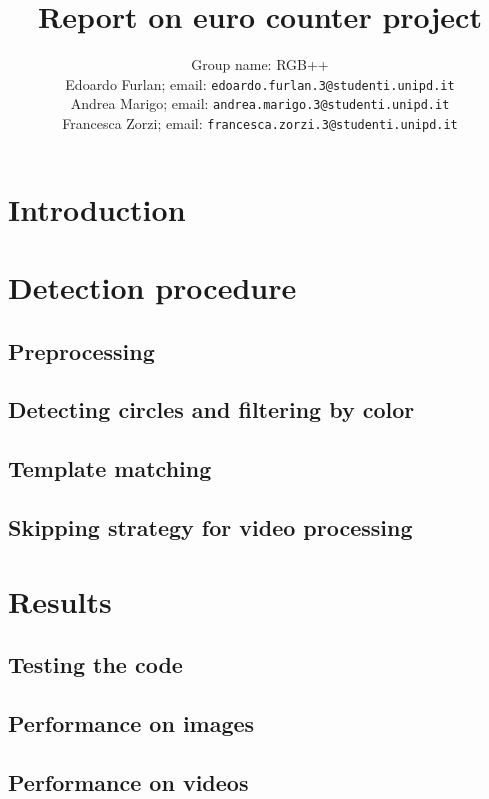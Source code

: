 \documentclass[11pt]{article}
\title{
	{Report on euro counter project}
}
\author{
	Group name: RGB++\\[5pt]
	Edoardo Furlan; email: \texttt{edoardo.furlan.3@studenti.unipd.it}\\
	Andrea Marigo; email: \texttt{andrea.marigo.3@studenti.unipd.it}\\
	Francesca Zorzi; email: \texttt{francesca.zorzi.3@studenti.unipd.it}\\
	}
\begin{document}
\maketitle				%
\pagestyle{fancy} 		%
\setcounter{page}{1}	%
\onehalfspacing 		%


\section{Introduction}


\section{Detection procedure}

\subsection{Preprocessing}

\subsection{Detecting circles and filtering by color}

\subsection{Template matching}

\subsection{Skipping strategy for video processing}


\section{Results}

\subsection{Testing the code}

\subsection{Performance on images}

\subsection{Performance on videos}

\end{document}
